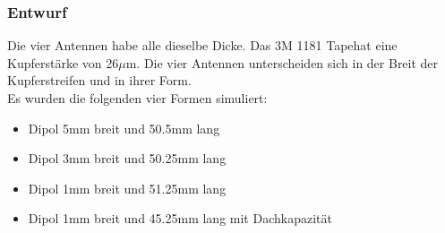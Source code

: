 \subsubsection*{Entwurf}
Die vier Antennen habe alle dieselbe Dicke. Das \glqq 3M 1181 Tape\grqq   hat eine Kupferstärke von 26$\mu$m. Die vier Antennen unterscheiden sich in der Breit der Kupferstreifen und in ihrer Form.\\
Es wurden die folgenden vier Formen simuliert:

\begin{itemize}
\item Dipol 5mm breit und 50.5mm lang
\item Dipol 3mm breit und 50.25mm lang
\item Dipol 1mm breit und 51.25mm lang
\item Dipol 1mm breit und 45.25mm lang mit Dachkapazität
\end{itemize}

